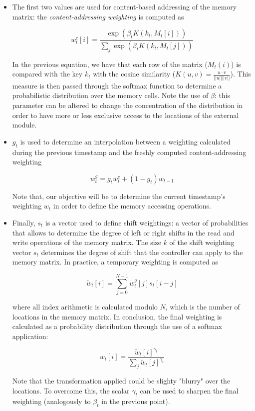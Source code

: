 \documentclass{article}
\begin{document}
\begin{itemize}
    \item The first two values are used for content-based addressing of the memory matrix: the \textit{content-addressing weighting} is computed as

        \begin{equation}
            w_t^c[i] = \frac{\exp(\beta_t K(k_t, M_t[i]))}{\sum_j \exp(\beta_t K(k_t, M_t[j]))}
        \end{equation}

    In the previous equation, we have that each row of the matrix ($M_t(i)$) is compared with the key $k_t$ with the cosine similarity ($K(u,v) = \frac{u \cdot v}{||u|| ||v||}$). This measure is then passed through the softmax function to determine a probabilistic distribution over the memory cells. Note the use of $\beta$: this parameter can be altered to change the concentration of the distribution in order to have more or less exclusive access to the locations of the external module.
    \item $g_t$ is used to determine an interpolation between a weighting calculated during the previous timestamp and the freshly computed content-addressing weighting

        \begin{equation}
            w_t^g = g_t w_t^c + (1-g_t)w_{t-1}
        \end{equation}

    Note that, our objective will be to determine the current timestamp's weighting $w_t$ in order to define the memory accessing operations.

    \item Finally, $s_t$ is a vector used to define shift weightings: a vector of probabilities that allows to determine the degree of left or right shifts in the read and write operations of the memory matrix. The size $k$ of the shift weighting vector $s_t$ determines the degree of shift that the controller can apply to the memory matrix. In practice, a temporary weighting is computed as
    
    \begin{equation}
        \tilde{w}_t[i] = \sum_{j=0}^{N-1}w_t^g[j]s_t[i-j]
    \end{equation}

    where all index arithmetic is calculated modulo $N$, which is the number of locations in the memory matrix. In conclusion, the final weighting is calculated as a probability distribution through the use of a softmax application:

    \begin{equation}
        w_t[i] = \frac{\tilde{w}_t[i]^{\gamma_t}}{\sum_j \tilde{w}_t[j]^{\gamma_t}}
    \end{equation}
    
    Note that the transformation applied could be slighty "blurry" over the locations. To overcome this, the scalar $\gamma_t$ can be used to sharpen the final weighting (analogously to $\beta_t$ in the previous point).
\end{itemize}
\end{document}
